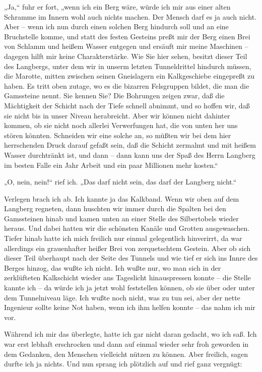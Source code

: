 „Ja,“ fuhr er fort, „wenn ich ein Berg wäre, würde ich mir aus
einer alten Schramme im Innern wohl auch nichts machen. Der Mensch
darf es ja auch nicht. Aber – wenn ich nun durch einen solchen Berg
hindurch soll und an eine Bruchstelle komme, und statt des festen
Gesteins preßt mir der Berg einen Brei von Schlamm und heißem
Wasser entgegen und ersäuft mir meine Maschinen – dagegen hilft mir
keine Charakterstärke. Wie Sie hier sehen, besitzt dieser Teil des
Langbergs, unter dem wir in unserm letzten Tunneldrittel hindurch
müssen, die Marotte, mitten zwischen seinen Gneislagern ein
Kalkgeschiebe eingepreßt zu haben. Es tritt oben zutage, wo es die
bizarren Felsgruppen bildet, die man die Gamssteine nennt. Sie
kennen Sie? Die Bohrungen zeigen zwar, daß die Mächtigkeit der
Schicht nach der Tiefe schnell abnimmt, und so hoffen wir, daß sie
nicht bis in unser Niveau herabreicht. Aber wir können nicht
dahinter kommen, ob sie nicht noch allerlei Verwerfungen hat, die
von unten her uns stören könnten. Schneiden wir eine solche an, so
müßten wir bei dem hier herrschenden Druck darauf gefaßt sein, daß
die Schicht zermalmt und mit heißem Wasser durchtränkt ist, und
dann – dann kann uns der Spaß des Herrn Langberg im besten Falle
ein Jahr Arbeit und ein paar Millionen mehr kosten.“

„O, nein, nein!“ rief ich. „Das darf nicht sein, das darf der
Langberg nicht.“

Verlegen brach ich ab. Ich kannte ja das Kalkband. Wenn wir oben
auf dem Langberg regneten, dann huschten wir immer durch die
Spalten bei den Gamssteinen hinab und kamen unten an einer Stelle
des Silbertobels wieder heraus. Und dabei hatten wir die schönsten
Kanäle und Grotten ausgewaschen. Tiefer hinab hatte ich mich
freilich nur einmal gelegentlich hinverirrt, da war allerdings ein
grauenhafter heißer Brei von zerquetschtem Gestein. Aber ob sich
dieser Teil überhaupt nach der Seite des Tunnels und wie tief er
sich ins Innre des Berges hinzog, das wußte ich nicht. Ich wußte
nur, wo man sich in der zerklüfteten Kalkschicht wieder ans
Tageslicht hinauspressen konnte – die Stelle kannte ich – da würde
ich ja jetzt wohl feststellen können, ob sie über oder unter dem
Tunnelniveau läge. Ich wußte noch nicht, was zu tun sei, aber der
nette Ingenieur sollte keine Not haben, wenn ich ihm helfen konnte
– das nahm ich mir vor.

Während ich mir das überlegte, hatte ich gar nicht daran gedacht,
wo ich saß. Ich war erst lebhaft erschrocken und dann auf einmal
wieder sehr froh geworden in dem Gedanken, den Menschen vielleicht
nützen zu können. Aber freilich, sagen durfte ich ja nichts. Und
nun sprang ich plötzlich auf und rief ganz vergnügt:

